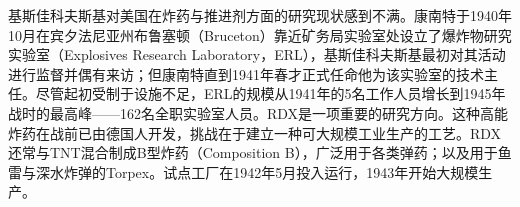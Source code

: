 基斯佳科夫斯基对美国在炸药与推进剂方面的研究现状感到不满。康南特于1940年10月在宾夕法尼亚州布鲁塞顿（Bruceton）靠近矿务局实验室处设立了爆炸物研究实验室（Explosives Research Laboratory，ERL），基斯佳科夫斯基最初对其活动进行监督并偶有来访；但康南特直到1941年春才正式任命他为该实验室的技术主任。尽管起初受制于设施不足，ERL的规模从1941年的5名工作人员增长到1945年战时的最高峰——162名全职实验室人员。RDX是一项重要的研究方向。这种高能炸药在战前已由德国人开发，挑战在于建立一种可大规模工业生产的工艺。RDX还常与TNT混合制成B型炸药（Composition B），广泛用于各类弹药；以及用于鱼雷与深水炸弹的Torpex。试点工厂在1942年5月投入运行，1943年开始大规模生产。

